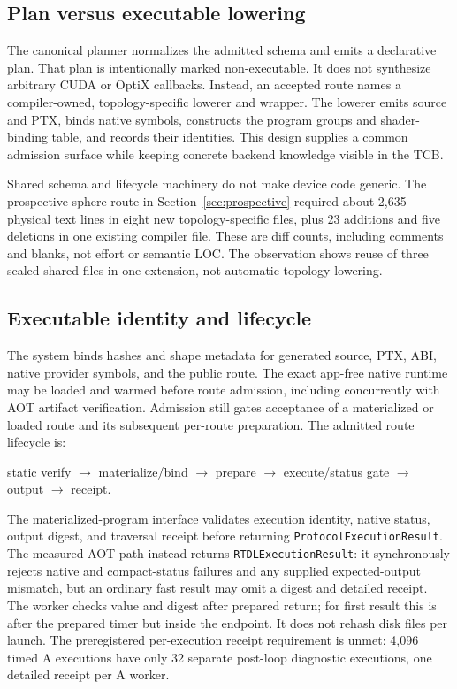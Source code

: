 \documentclass[sigplan,screen,review,anonymous]{acmart}
\begin{document}
\subsection{Plan versus executable lowering}

The canonical planner normalizes the admitted schema and emits a declarative
plan. That plan is intentionally marked non-executable. It does not synthesize
arbitrary CUDA or OptiX callbacks. Instead, an accepted route names a
compiler-owned, topology-specific lowerer and wrapper. The lowerer emits source
and PTX, binds native symbols, constructs the program groups and shader-binding
table, and records their identities. This design supplies a common admission
surface while keeping concrete backend knowledge visible in the TCB.

Shared schema and lifecycle machinery do not make device code generic. The
prospective sphere route in Section~\ref{sec:prospective} required about 2,635
physical text lines in eight new topology-specific files, plus 23 additions
and five deletions in one existing compiler file. These are diff counts,
including comments and blanks, not effort or semantic LOC. The observation
shows reuse of three sealed shared files in one extension, not automatic
topology lowering.

\subsection{Executable identity and lifecycle}
\label{sec:lifecycle}

The system binds hashes and shape metadata for generated source, PTX, ABI,
native provider symbols, and the public route. The exact app-free native runtime
may be loaded and warmed before route admission, including concurrently with
AOT artifact verification. Admission still gates acceptance of a materialized
or loaded route and its subsequent per-route preparation. The admitted route
lifecycle is:

\begin{center}
\small
static verify $\rightarrow$ materialize/bind $\rightarrow$ prepare
$\rightarrow$ execute/status gate $\rightarrow$ output $\rightarrow$ receipt.
\end{center}

The materialized-program interface validates execution identity, native status,
output digest, and traversal receipt before returning
\texttt{ProtocolExecution}\allowbreak\texttt{Result}. The measured AOT path instead returns
\texttt{RTDLExecutionResult}: it synchronously rejects native and
compact-status failures and any supplied expected-output mismatch, but an
ordinary fast result may omit a digest and detailed receipt. The worker checks
value and digest after prepared return; for first result this is after the
prepared timer but inside the endpoint. It does not rehash disk files per
launch. The preregistered per-execution receipt requirement is unmet: 4,096
timed A executions have only 32 separate post-loop diagnostic executions, one
detailed receipt per A worker.
\end{document}
